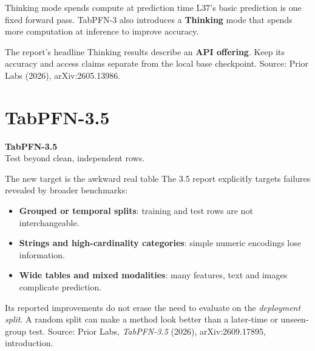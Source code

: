 \documentclass[aspectratio=169]{beamer}
\begin{document}
\begin{frame}{Thinking mode spends compute at prediction time}
  \small
  L37's basic prediction is one fixed forward pass. TabPFN-3 also introduces a
  \textbf{Thinking} mode that spends more computation at inference to improve accuracy.
  \vskip 12pt
  \begin{center}
  \end{center}
  \vskip 12pt
  The report's headline Thinking results describe an \textbf{API offering}. Keep its
  accuracy and access claims separate from the local base checkpoint.
  \vskip 4pt
  {\scriptsize Source: Prior Labs (2026), arXiv:2605.13986.}
\end{frame}

\section{TabPFN-3.5}
\begin{frame}[plain]
  \vfill\centering
  {\Large\color{popblue}\textbf{TabPFN-3.5}}\\[9pt]
  {\small Test beyond clean, independent rows.}
  \vfill
\end{frame}

\begin{frame}{The new target is the awkward real table}
  \small
  The 3.5 report explicitly targets failures revealed by broader benchmarks:
  \vskip 8pt
  \begin{itemize}\itemsep 7pt
    \item \textbf{Grouped or temporal splits}: training and test rows are not interchangeable.
    \item \textbf{Strings and high-cardinality categories}: simple numeric encodings lose information.
    \item \textbf{Wide tables and mixed modalities}: many features, text and images complicate prediction.
  \end{itemize}
  \vskip 10pt
  Its reported improvements do not erase the need to evaluate on the \emph{deployment split}.
  A random split can make a method look better than a later-time or unseen-group test.
  \vskip 5pt
  {\scriptsize Source: Prior Labs, \emph{TabPFN-3.5} (2026), arXiv:2609.17895, introduction.}
\end{frame}
\end{document}

